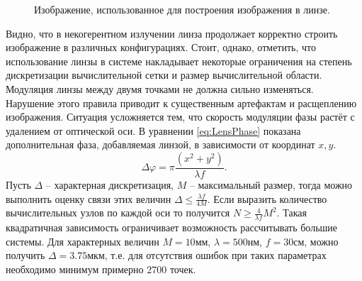 \begin{figure}[h]
	\caption{Изображение, использованное для построения изображения в линзе.}
	\label{ris:LensImage}
\end{figure}
Видно, что в некогерентном излучении линза продолжает корректно строить изображение в различных конфигурациях. Стоит, однако, отметить, что использование линзы в системе накладывает некоторые ограничения на степень дискретизации вычислительной сетки и размер вычислительной области. Модуляция линзы между двумя точками не должна сильно изменяться. Нарушение этого правила приводит к существенным артефактам и расщеплению изображения. Ситуация усложняется тем, что скорость модуляции фазы растёт с удалением от оптической оси. В уравнении \ref{eq:LensPhase} показана дополнительная фаза, добавляемая линзой, в зависимости от координат $x,y$.
\begin{equation}\label{eq:LensPhase}
	\Delta\varphi = \pi\frac{\left(x^2 +y^2\right)}{\lambda f}.
\end{equation}
Пусть $\Delta$ -- характерная дискретизация, $M$ -- максимальный размер, тогда можно выполнить оценку связи этих величин $\Delta \le \frac{\lambda f}{4M}$. Если выразить количество вычислительных узлов по каждой оси то получится $N \ge \frac{4}{\lambda f} M^2$. Такая квадратичная зависимость	 ограничивает возможность рассчитывать большие системы. Для характерных величин $M=10$мм, $\lambda=500$нм, $f=30$см, можно получить $\Delta=3.75$мкм, т.е. для отсутствия ошибок при таких параметрах необходимо минимум примерно $2700$ точек.
